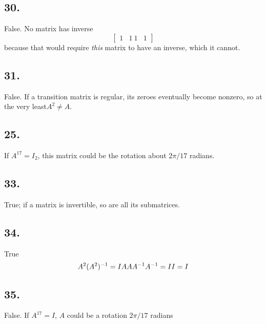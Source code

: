 \documentclass[]{article}
\newenvironment{Shaded}{\begin{snugshade}}{\end{snugshade}}
\newcommand{\DecValTok}[1]{\textcolor[rgb]{0.69,0.50,0.00}{#1}}
\newcommand{\KeywordTok}[1]{\textcolor[rgb]{0.12,0.11,0.11}{\textbf{#1}}}
\newcommand{\NormalTok}[1]{\textcolor[rgb]{0.12,0.11,0.11}{#1}}
\newcommand{\OperatorTok}[1]{\textcolor[rgb]{0.12,0.11,0.11}{#1}}
\newcommand{\StringTok}[1]{\textcolor[rgb]{0.75,0.01,0.01}{#1}}
\newcommand{\m}[1]{\begin{bmatrix}#1\end{bmatrix}}
\begin{document}
\hypertarget{section-142}{%
\subsection{30.}\label{section-142}}

False. No matrix has inverse \[\m{1&1\
1&1}\] because that would require \emph{this} matrix to have an inverse,
which it cannot.

\hypertarget{section-143}{%
\subsection{31.}\label{section-143}}

False. If a transition matrix is regular, its zeroes eventually become
nonzero, so at the very least\(A^2\neq{A}\).

\hypertarget{section-144}{%
\subsection{25.}\label{section-144}}

If \(A^17=I_2\), this matrix could be the rotation about \(2\pi/17\)
radians.

\hypertarget{section-145}{%
\subsection{33.}\label{section-145}}

True; if a matrix is invertible, so are all its submatrices.

\hypertarget{section-146}{%
\subsection{34.}\label{section-146}}

True \[A^2(A^2)^{-1}=I\\
AAA^{-1}A^{-1}=I\\
I=I\]

\hypertarget{section-147}{%
\subsection{35.}\label{section-147}}

False. If \(A^17=I\), \(A\) could be a rotation \(2\pi/17\) radians

\begin{Shaded}
\end{Shaded}
\end{document}
